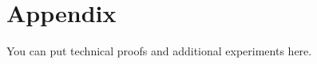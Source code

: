 \documentclass{article}
\begin{document}







 


\appendix
\section{Appendix}
You can put technical proofs and additional experiments here.
\end{document}
